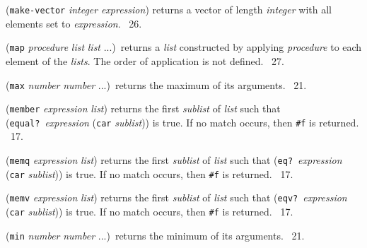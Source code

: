 \documentclass[10pt,twocolumn]{article}
\begin{document}
(\texttt{make-vector} \emph{integer} \emph{expression}) returns a
vector of length \emph{integer} with all elements set to
\emph{expression}.  \RRRRRS~26.

(\texttt{map} \emph{procedure} \emph{list} \emph{list} ...)\ returns a
\emph{list} constructed by applying \emph{procedure} to each element
of the \emph{lists}.  The order of application is not defined.
\RRRRRS~27.

(\texttt{max} \emph{number} \emph{number} ...)\ returns the maximum of
its arguments.  \RRRRRS~21.

(\texttt{member} \emph{expression} \emph{list}) returns the first
\emph{sublist} of \emph{list} such that
(\texttt{equal?}\ \emph{expression} (\texttt{car} \emph{sublist})) is
true. If no match occurs, then \texttt{\#f} is returned.  \RRRRRS~17.

(\texttt{memq} \emph{expression} \emph{list}) returns the first
\emph{sublist} of \emph{list} such that
(\texttt{eq?}\ \emph{expression} (\texttt{car} \emph{sublist})) is
true. If no match occurs, then \texttt{\#f} is returned.  \RRRRRS~17.

(\texttt{memv} \emph{expression} \emph{list}) returns the first
\emph{sublist} of \emph{list} such that
(\texttt{eqv?}\ \emph{expression} (\texttt{car} \emph{sublist})) is
true. If no match occurs, then \texttt{\#f} is returned.  \RRRRRS~17.

(\texttt{min} \emph{number} \emph{number} ...)\ returns the minimum of
its arguments.  \RRRRRS~21.
\end{document}
